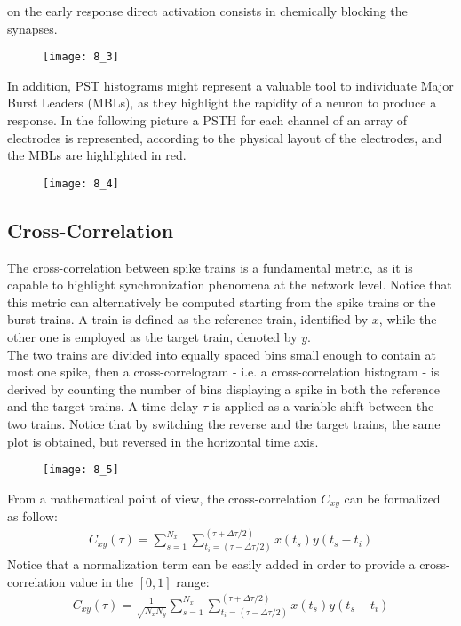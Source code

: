 on the early response direct activation consists in chemically blocking the synapses.
\begin{figure}[H]
    \texttt{[image: 8\_3]}
    \centering
\end{figure}
In addition, PST histograms might represent a valuable tool to individuate Major Burst
Leaders (MBLs), as they highlight the rapidity of a neuron to produce a response. In the
following picture a PSTH for each channel of an array of electrodes is represented,
according to the physical layout of the electrodes, and the MBLs are highlighted in red.
\begin{figure}[H]
    \texttt{[image: 8\_4]}
    \centering
\end{figure}

\subsection{Cross-Correlation}
The cross-correlation between spike trains is a fundamental metric, as it is capable
to highlight synchronization phenomena at the network level. Notice that this metric
can alternatively be computed starting from the spike trains or the burst trains.
A train is defined as the reference train, identified by \(x\), while the other
one is employed as the target train, denoted by \(y\).\\
The two trains are divided into equally spaced bins small enough to contain at most
one spike, then a cross-correlogram - i.e. a cross-correlation histogram - is derived
by counting the number of bins displaying a spike in both the reference and the target
trains. A time delay \(\tau\) is applied as a variable shift between the two trains.
Notice that by switching the reverse and the target trains, the same plot is obtained,
but reversed in the horizontal time axis.
\begin{figure}[H]
    \texttt{[image: 8\_5]}
    \centering
\end{figure}
From a mathematical point of view, the cross-correlation \(C_{xy}\) can be formalized
as follow:
\begin{align*}
    C_{xy}(\tau)
    =\sum_{s=1}^{N_x}\sum_{t_{i}=(\tau-\Delta{\tau}/2)}^{(\tau+\Delta{\tau}/2)}x(t_s)y(t_s-t_i)
\end{align*}
Notice that a normalization term can be easily added in order to provide
a cross-correlation value in the \([0, 1]\) range:
\begin{align*}
    C_{xy}(\tau)
    =\frac{1}{\sqrt{N_xN_y}}\sum_{s=1}^{N_x}\sum_{t_{i}=(\tau-\Delta{\tau}/2)}^{(\tau+\Delta{\tau}/2)}x(t_s)y(t_s-t_i)
\end{align*}
